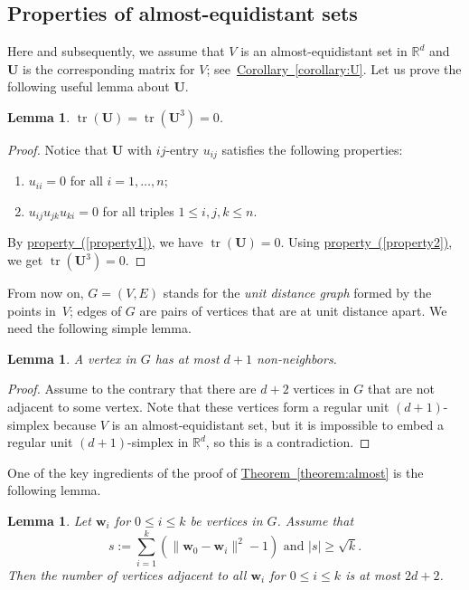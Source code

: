\documentclass[a4paper, oneside, reqno, 12pt]{amsart}
\theoremstyle{plain}
\newtheorem{lemma}[theorem]{Lemma}
\theoremstyle{definition}
\DeclareMathOperator{\tr}{tr}
\begin{document}
\subsection{Properties of almost-equidistant sets}
Here and subsequently, we assume that $V$ is an almost-equidistant set in $\mathbb R^d$ and $\mathbf U$ is the corresponding matrix for $V$; see~\hyperref[corollary:U]{Corollary~\ref*{corollary:U}}. Let us prove the following useful lemma about $\mathbf U$.
\begin{lemma}\label{lemma:trace} $\tr(\mathbf U)=\tr(\mathbf U^3)=0$.
\end{lemma}
\begin{proof}
Notice that $\mathbf U$ with $ij$-entry $u_{ij}$ satisfies the following properties:
\begin{enumerate}
\item \label{property1}$u_{ii}=0$ for all $i=1,\dots, n$;
\item \label{property2}$u_{ij}u_{jk}u_{ki}=0$ for all triples $1\leq i,j,k\leq n$.
\end{enumerate}
By \hyperref[property1]{property~(\ref*{property1})}, we have $\tr(\mathbf U)=0$. Using \hyperref[property2]{property~(\ref*{property2})}, we get $\tr (\mathbf U^3)=0$.
\end{proof}
From now on, $G=(V, E)$ stands for the \textit{unit distance graph} formed by the points in~$V$; edges of $G$ are pairs of vertices that are at unit distance apart. We need the following simple lemma.
\begin{lemma}\label{lemma:d+2}
A vertex in $G$ has at most $d+1$ non-neighbors.
\end{lemma}
\begin{proof}
Assume to the contrary that there are $d+2$ vertices in $G$ that are not adjacent to some vertex. Note that these vertices form a regular unit $(d+1)$-simplex because $V$ is an almost-equidistant set, but it is impossible to embed a regular unit $(d+1)$-simplex in $\mathbb R^d$, so this is a contradiction.
\end{proof}
One of the key ingredients of the proof of \hyperref[theorem:almost]{Theorem~\ref*{theorem:almost}} is the following lemma.
\begin{lemma}\label{lemma:simplex}
Let $\mathbf w_i$ for $0\leq i\leq k$ be vertices in $G$. Assume that 
\[
s:=\sum_{i=1}^k \left(\|\mathbf w_0-\mathbf w_i\|^2-1\right)\text{ and } |s| \geq \sqrt{k}.
\]
Then the number of vertices adjacent to all $\mathbf w_i$ for $0\leq i\leq k$ is at most $2d+2$.
\end{lemma}
\end{document}
